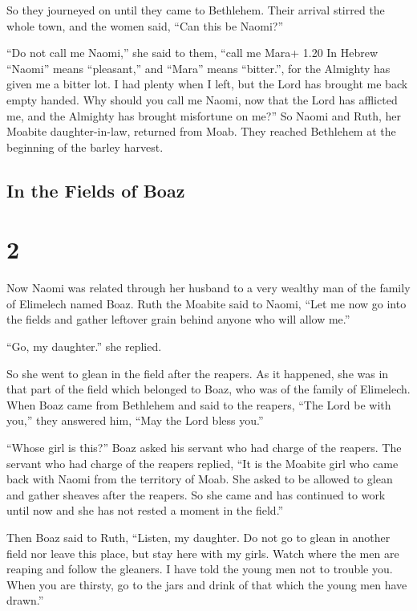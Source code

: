  So they journeyed on until they came to Bethlehem. Their
arrival stirred the whole town, and the women said, ``Can this be
Naomi?''

 ``Do not call me Naomi,'' she said to them, ``call me
Mara+ 1.20 In Hebrew ``Naomi'' means ``pleasant,'' and ``Mara'' means
``bitter.'', for the Almighty has given me a bitter lot.  I
had plenty when I left, but the Lord has brought me back empty handed.
Why should you call me Naomi, now that the Lord has afflicted me, and
the Almighty has brought misfortune on me?''  So Naomi and
Ruth, her Moabite daughter-in-law, returned from Moab. They reached
Bethlehem at the beginning of the barley harvest.

\hypertarget{in-the-fields-of-boaz}{%
\subsection{In the Fields of Boaz}\label{in-the-fields-of-boaz}}

\hypertarget{section-1}{%
\section{2}\label{section-1}}

 Now Naomi was related through her husband to a very wealthy
man of the family of Elimelech named Boaz.  Ruth the Moabite
said to Naomi, ``Let me now go into the fields and gather leftover grain
behind anyone who will allow me.''

``Go, my daughter.'' she replied.

 So she went to glean in the field after the reapers. As it
happened, she was in that part of the field which belonged to Boaz, who
was of the family of Elimelech.  When Boaz came from
Bethlehem and said to the reapers, ``The Lord be with you,'' they
answered him, ``May the Lord bless you.''

 ``Whose girl is this?'' Boaz asked his servant who had
charge of the reapers.  The servant who had charge of the
reapers replied, ``It is the Moabite girl who came back with Naomi from
the territory of Moab.  She asked to be allowed to glean and
gather sheaves after the reapers. So she came and has continued to work
until now and she has not rested a moment in the field.''

 Then Boaz said to Ruth, ``Listen, my daughter. Do not go to
glean in another field nor leave this place, but stay here with my
girls.  Watch where the men are reaping and follow the
gleaners. I have told the young men not to trouble you. When you are
thirsty, go to the jars and drink of that which the young men have
drawn.''

